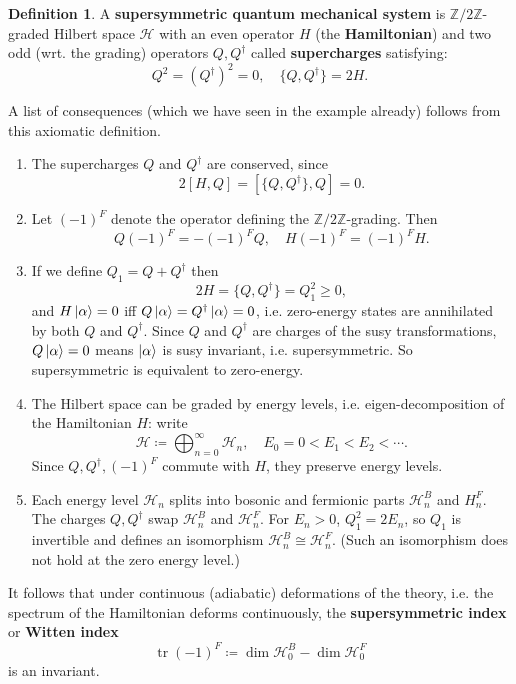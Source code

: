 \documentclass{report}
\theoremstyle{plain}
\theoremstyle{definition}
\newtheorem{definition}[theorem]{Definition}
\theoremstyle{remark}
\newcommand{\bZ}{\mathbb{Z}}
\newcommand{\cH}{\mathcal{H}}
\DeclareMathOperator{\tr}{tr}
\newcommand{\mc}{\mathcal}
\begin{document}
\begin{definition} \label{def:susy-qm-system}
  A \textbf{supersymmetric quantum mechanical system} is
  $\bZ/2\bZ$-graded Hilbert space $\mc H$ with an even operator $H$
  (the {\bf Hamiltonian}) and two odd (wrt. the grading) operators
  $Q,Q^\dag$ called {\bf supercharges} satisfying:
  \[ Q^2=(Q^\dagger)^2=0, \quad \{Q,Q^\dag\}=2H. \]
\end{definition}

A list of consequences (which we have seen in the example already)
follows from this axiomatic definition.
\begin{enumerate}
\item The supercharges $Q$ and $Q^\dag$ are conserved, since
  \[ 2[H, Q] = [\{Q, Q^\dag\}, Q] = 0. \]
\item Let $(-1)^F$ denote the operator defining the
  $\bZ/2\bZ$-grading. Then
  \[ Q(-1)^F = -(-1)^FQ, \quad H(-1)^F = (-1)^FH. \]
\item If we define $Q_1=Q+Q^\dagger$ then
  \[ 2H = \{Q, Q^\dag\} = Q_1^2 \ge 0, \]
  and $H\ket{\alpha} = 0$ iff $Q\ket{\alpha} = Q^\dag\ket{\alpha} =
  0$, i.e. zero-energy states are annihilated by both $Q$ and
  $Q^\dag$. Since $Q$ and $Q^\dag$ are charges of the susy
  transformations, $Q\ket{\alpha} = 0$ means $\ket{\alpha}$ is susy
  invariant, i.e. supersymmetric. So supersymmetric is equivalent to
  zero-energy.
\item The Hilbert space can be graded by energy levels, i.e.
  eigen-decomposition of the Hamiltonian $H$: write
  \[ \mc H \coloneqq \bigoplus_{n=0}^\infty \mc H_n, \quad E_0 = 0 < E_1 < E_2 < \cdots. \]
  Since $Q, Q^\dag, (-1)^F$ commute with $H$, they preserve energy
  levels.
\item Each energy level $\mc H_n$ splits into bosonic and fermionic
  parts $\mc H_n^B$ and $H_n^F$. The charges $Q, Q^\dag$ swap $\mc
  H_n^B$ and $\mc H_n^F$. For $E_n > 0$, $Q_1^2 = 2E_n$, so $Q_1$ is
  invertible and defines an isomorphism $\mc H_n^B \cong \mc H_n^F$.
  (Such an isomorphism does not hold at the zero energy level.)
\end{enumerate}
It follows that under continuous (adiabatic) deformations of the
theory, i.e. the spectrum of the Hamiltonian deforms continuously, the
{\bf supersymmetric index} or {\bf Witten index}
\[ \tr (-1)^F \coloneqq \dim \cH_0^B - \dim \cH_0^F \]
is an invariant.
\end{document}
